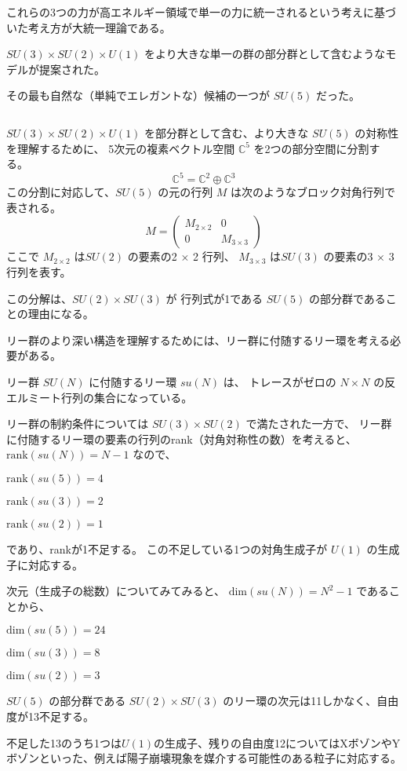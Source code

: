 \documentclass[uplatex,a4j,12pt,dvipdfmx]{jsarticle}
\begin{document}
これらの3つの力が高エネルギー領域で単一の力に統一されるという考えに基づいた考え方が大統一理論である。

$SU(3) \times SU(2) \times U(1)$
をより大きな単一の群の部分群として含むようなモデルが提案された。

その最も自然な（単純でエレガントな）候補の一つが $SU(5)$ だった。

${}$

$SU(3) \times SU(2) \times U(1)$
を部分群として含む、より大きな
$SU(5)$ の対称性を理解するために、
5次元の複素ベクトル空間 $\mathbb{C}^{5}$ を2つの部分空間に分割する。
$$ \mathbb{C}^{5} = \mathbb{C}^{2} \oplus \mathbb{C}^{3} $$
この分割に対応して、$SU(5)$ の元の行列 $M$ は次のようなブロック対角行列で表される。
$$
	M =
	\left(
	\begin{array}{cc}
			M_{2 \times 2} & 0              \\
			0              & M_{3 \times 3}
		\end{array}
	\right)
$$
ここで $M_{2 \times 2}$ は$SU(2)$ の要素の2 $\times$ 2 行列、
$M_{3 \times 3}$ は$SU(3)$ の要素の3 $\times$ 3 行列を表す。

この分解は、$SU(2) \times SU(3)$ が 行列式が1である $SU(5)$ の部分群であることの理由になる。

リー群のより深い構造を理解するためには、リー群に付随するリー環を考える必要がある。

リー群 $SU(N)$ に付随するリー環 $su(N)$ は、
トレースがゼロの $N \times N$ の反エルミート行列の集合になっている。

リー群の制約条件については $SU(3) \times SU(2)$ で満たされた一方で、
リー群に付随するリー環の要素の行列のrank（対角対称性の数）を考えると、
$\text{rank}(su(N))=N-1$
なので、

$\text{rank}(su(5))=4$

$\text{rank}(su(3))=2$

$\text{rank}(su(2))=1$

であり、rankが1不足する。
この不足している1つの対角生成子が $U(1)$ の生成子に対応する。

次元（生成子の総数）についてみてみると、
$\text{dim}(su(N))=N^{2} -1$
であることから、

$\text{dim}(su(5))=24$

$\text{dim}(su(3))=8$

$\text{dim}(su(2))=3$

$SU(5)$ の部分群である $SU(2) \times SU(3)$ のリー環の次元は11しかなく、自由度が13不足する。

不足した13のうち1つは$U(1)$の生成子、残りの自由度12についてはXボゾンやYボゾンといった、例えば陽子崩壊現象を媒介する可能性のある粒子に対応する。
\end{document}

